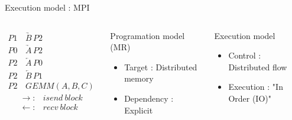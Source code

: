 \documentclass[tikz,presentation,border=10pt]{beamer}
\begin{document}
\begin{frame}[t]{Execution model : MPI}
\begin{columns}

        \begin{columns}
            \begin{equation*}
                \begin{aligned}
                    P1 \,  & \underrightarrow{B} \, P2 \\
                    P0 \,& \underrightarrow{A} \,P2 \\
                    P2 \,& \underleftarrow{A}  \,P0  \\
                    P2 \,& \underleftarrow{B}  \,P1 \\
                    P2 \,& GEMM(A,B,C)
                \end{aligned}
            \end{equation*}
            \begin{align*}
                \rightarrow : & isend\ block \\
                \leftarrow :  & recv\ block
            \end{align*}
        \end{columns}

            \begin{block}{Programation model (MR)}
                \begin{itemize}
                    \item Target : Distributed memory
                    \item Dependency : Explicit    
                \end{itemize}
            \end{block}
            \begin{exampleblock}{Execution model}
                \begin{itemize}
                    \item Control : Distributed flow
                    \item Execution : "In Order (IO)"
                \end{itemize}
            \end{exampleblock}
    \end{columns}
\end{frame}
\end{document}
